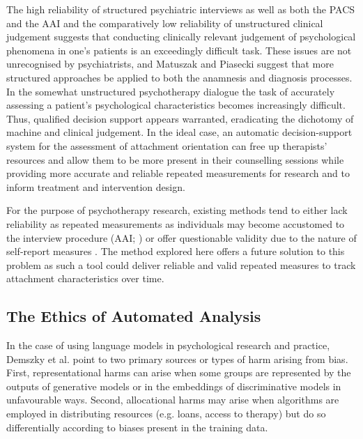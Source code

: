 \documentclass[12pt]{report}
\begin{document}
The high reliability of structured psychiatric interviews as well as both the PACS and the AAI and the comparatively low reliability of unstructured clinical judgement suggests that conducting clinically relevant judgement of psychological phenomena in one's patients is an exceedingly difficult task.
These issues are not unrecognised by psychiatrists, and Matuszak and Piasecki \citeyear{Matuszak2012} suggest that more structured approaches be applied to both the anamnesis and diagnosis processes.
In the somewhat unstructured psychotherapy dialogue the task of accurately assessing a patient's psychological characteristics becomes increasingly difficult.
Thus, qualified decision support appears warranted, eradicating the dichotomy of machine and clinical judgement.
In the ideal case, an automatic decision-support system for the assessment of attachment orientation can free up therapists' resources and allow them to be more present in their counselling sessions while providing more accurate and reliable repeated measurements for research and to inform treatment and intervention design.

For the purpose of psychotherapy research, existing methods tend to either lack reliability as repeated measurements as individuals may become accustomed to the interview procedure (AAI; ) or offer questionable validity due to the nature of self-report measures \cite{Talia2017}.
The method explored here offers a future solution to this problem as such a tool could deliver reliable and valid repeated measures to track attachment characteristics over time.

\subsection{The Ethics of Automated Analysis}
In the case of using language models in psychological research and practice, Demszky et al. \citeyear{Demszky2023} point to two primary sources or types of harm arising from bias.
First, representational harms can arise when some groups are represented by the outputs of generative models or in the embeddings of discriminative models in unfavourable ways.
Second, allocational harms may arise when algorithms are employed in distributing resources (e.g. loans, access to therapy) but do so differentially according to biases present in the training data.
\end{document}
